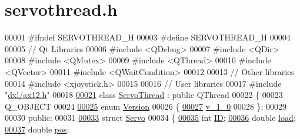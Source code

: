 \hypertarget{servothread_8h_source}{}\section{servothread.\+h}

\begin{DoxyCode}
00001 \textcolor{preprocessor}{#ifndef SERVOTHREAD\_H}
00003 \textcolor{preprocessor}{#define SERVOTHREAD\_H}
00004 
00005 \textcolor{comment}{// Qt Libraries}
00006 \textcolor{preprocessor}{#include <QDebug>}
00007 \textcolor{preprocessor}{#include <QDir>}
00008 \textcolor{preprocessor}{#include <QMutex>}
00009 \textcolor{preprocessor}{#include <QThread>}
00010 \textcolor{preprocessor}{#include <QVector>}
00011 \textcolor{preprocessor}{#include <QWaitCondition>}
00012 
00013 \textcolor{comment}{// Other libraries}
00014 \textcolor{preprocessor}{#include <xjoystick.h>}
00015 
00016 \textcolor{comment}{// User libraries}
00017 \textcolor{preprocessor}{#include "\hyperlink{ax12_8h}{dxl/ax12.h}"}
00018 
\hypertarget{servothread_8h_source_l00021}{}\hyperlink{class_servo_thread}{00021} \textcolor{keyword}{class }\hyperlink{class_servo_thread}{ServoThread} : \textcolor{keyword}{public} QThread
00022 \{
00023     Q\_OBJECT
00024     
\hypertarget{servothread_8h_source_l00025}{}\hyperlink{class_servo_thread_aeccce0ac6a969e2ee7cbe91687e2d085}{00025}     \textcolor{keyword}{enum} \hyperlink{class_servo_thread_aeccce0ac6a969e2ee7cbe91687e2d085}{Version} 
00026     \{
\hypertarget{servothread_8h_source_l00027}{}\hyperlink{class_servo_thread_aeccce0ac6a969e2ee7cbe91687e2d085a319b6bf2cb120faeefbd0a5118ece7e3}{00027}         \hyperlink{class_servo_thread_aeccce0ac6a969e2ee7cbe91687e2d085a319b6bf2cb120faeefbd0a5118ece7e3}{v\_1\_0}
00028     \};
00029     
00030 \textcolor{keyword}{public}:
00031     
\hypertarget{servothread_8h_source_l00033}{}\hyperlink{struct_servo_thread_1_1_servo}{00033}     \textcolor{keyword}{struct }\hyperlink{struct_servo_thread_1_1_servo}{Servo} 
00034     \{
\hypertarget{servothread_8h_source_l00035}{}\hyperlink{struct_servo_thread_1_1_servo_a06b514c42113aa85fd1703fc88fca7ce}{00035}         \textcolor{keywordtype}{int} \hyperlink{struct_servo_thread_1_1_servo_a06b514c42113aa85fd1703fc88fca7ce}{ID};         
\hypertarget{servothread_8h_source_l00036}{}\hyperlink{struct_servo_thread_1_1_servo_ae378d77acf16b306649c87fdb8df677e}{00036}         \textcolor{keywordtype}{double} \hyperlink{struct_servo_thread_1_1_servo_ae378d77acf16b306649c87fdb8df677e}{load};    
\hypertarget{servothread_8h_source_l00037}{}\hyperlink{struct_servo_thread_1_1_servo_a9fa0aa56944b9b0bb9d66303d5bd4b59}{00037}         \textcolor{keywordtype}{double} \hyperlink{struct_servo_thread_1_1_servo_a9fa0aa56944b9b0bb9d66303d5bd4b59}{pos};     

\end{DoxyCode}
